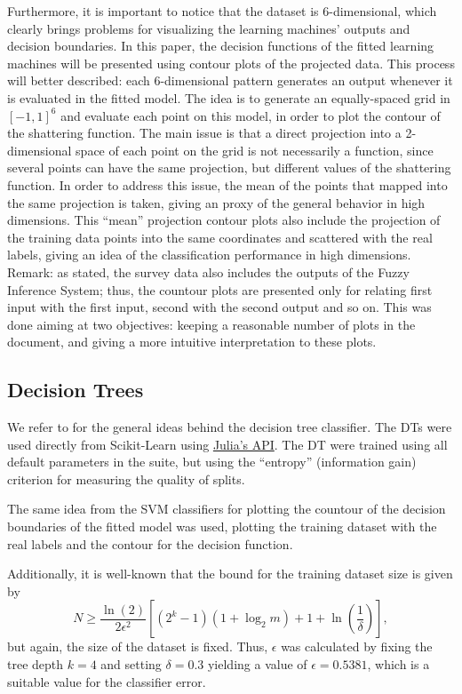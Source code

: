 \documentclass[conference]{IEEEtran}
\theoremstyle{definition}
\theoremstyle{remark}
\theoremstyle{remark}
\begin{document}
Furthermore, it is important to notice that the dataset is 6-dimensional, which
clearly brings problems for visualizing the learning machines' outputs and
decision boundaries. In this paper, the decision functions of the fitted
learning machines will be presented using contour plots of the projected data.
This process will better described: each 6-dimensional pattern generates an
output whenever it is evaluated in the fitted model. The idea is to generate an
equally-spaced grid in $[-1,1]^6$ and evaluate each point on this model, in
order to plot the contour of the shattering function. The main issue is that a
direct projection into a 2-dimensional space of each point on the grid is not
necessarily a function, since several points can have the same projection, but
different values of the shattering function. In order to address this issue,
the mean of the points that mapped into the same projection is taken, giving an
proxy of the general behavior in high dimensions. This ``mean'' projection
contour plots also include the projection of the training data points into the
same coordinates and scattered with the real labels, giving an idea of the
classification performance in high dimensions. Remark: as stated, the survey
data also includes the outputs of the Fuzzy Inference System; thus, the countour
plots are presented only for relating first input with the first input, second
with the second output and so on. This was done aiming at two objectives:
keeping a reasonable number of plots in the document, and giving a more
intuitive interpretation to these plots.

\subsection{Decision Trees}
We refer to \textcite{bramer2007} for the general ideas behind the decision tree
classifier. The DTs were used directly from Scikit-Learn
\parencite{scikit-learn, sklearn_api} using
\href{https://bit.ly/3lDHADX}{Julia's API}. The DT were trained using all
default parameters in the suite, but using the ``entropy'' (information gain)
criterion for measuring the quality of splits.

The same idea from the SVM classifiers for plotting the countour of the decision
boundaries of the fitted model was used, plotting the training dataset with the
real labels and the contour for the decision function.

Additionally, it is well-known that the bound for the training dataset size is
given by
\begin{equation}
  N\geq \dfrac{\ln(2)}{2\epsilon^2}\left[(2^k-1)(1+\log_2 m) + 1 + \ln\left(
  \dfrac{1}{\delta}\right)\right],
\end{equation}
but again, the size of the dataset is fixed. Thus, $\epsilon$ was calculated by
fixing the tree depth $k=4$ and setting $\delta=0.3$ yielding a value of
$\epsilon=0.5381$, which is a suitable value for the classifier error.
\end{document}
